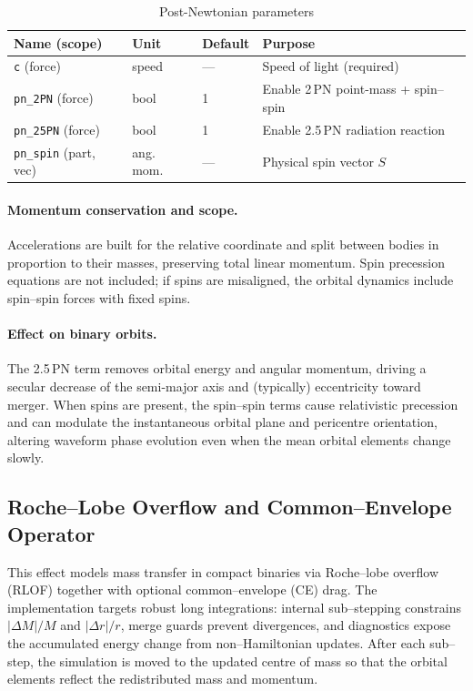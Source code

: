 \documentclass[11pt]{article}
\begin{document}
\begin{table}[h]
\centering\footnotesize
\caption{Post-Newtonian parameters}
\label{tab:pn}
\begin{tabular}{@{}llll@{}}
\toprule
Name (scope) & Unit & Default & Purpose \\
\midrule
\texttt{c} (force) & speed & --- & Speed of light (required) \\
\texttt{pn\_2PN} (force) & bool & 1 & Enable 2\,PN point-mass + spin--spin \\
\texttt{pn\_25PN} (force) & bool & 1 & Enable 2.5\,PN radiation reaction \\
\texttt{pn\_spin} (part, vec) & ang. mom. & --- & Physical spin vector $S$ \\
\bottomrule
\end{tabular}
\end{table}

\paragraph{Momentum conservation and scope.}
Accelerations are built for the relative coordinate and split between bodies
in proportion to their masses, preserving total linear momentum.
Spin precession equations are not included; if spins are misaligned, the
orbital dynamics include spin--spin forces with fixed spins.

\paragraph{Effect on binary orbits.}
The 2.5\,PN term removes orbital energy and angular momentum, driving a secular
decrease of the semi-major axis and (typically) eccentricity toward merger.
When spins are present, the spin–spin terms cause relativistic
precession and can modulate the instantaneous orbital plane and pericentre
orientation, altering waveform phase evolution even when the mean orbital
elements change slowly.



\subsection{Roche–Lobe Overflow and Common–Envelope Operator}
\label{sec:RLOF}

This effect models mass transfer in compact binaries via Roche–lobe overflow
(RLOF) together with optional common–envelope (CE) drag. The implementation
targets robust long integrations: internal sub–stepping constrains
$|\Delta M|/M$ and $|\Delta r|/r$, merge guards prevent divergences, and
diagnostics expose the accumulated energy change from non–Hamiltonian updates.
After each sub–step, the simulation is moved to the updated centre of mass so
that the orbital elements reflect the redistributed mass and momentum.
\end{document}
